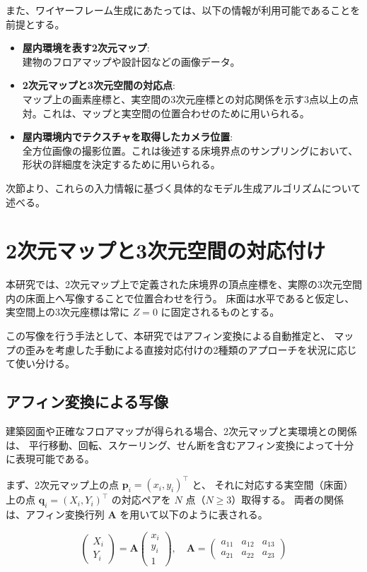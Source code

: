 また、ワイヤーフレーム生成にあたっては、以下の情報が利用可能であることを前提とする。

\begin{itemize}
  \item \textbf{屋内環境を表す2次元マップ}: \\
  建物のフロアマップや設計図などの画像データ。
  \item \textbf{2次元マップと3次元空間の対応点}: \\
  マップ上の画素座標と、実空間の3次元座標との対応関係を示す3点以上の点対。これは、マップと実空間の位置合わせのために用いられる。
  \item \textbf{屋内環境内でテクスチャを取得したカメラ位置}: \\
  全方位画像の撮影位置。これは後述する床境界点のサンプリングにおいて、形状の詳細度を決定するために用いられる。
\end{itemize}

次節より、これらの入力情報に基づく具体的なモデル生成アルゴリズムについて述べる。


\section{2次元マップと3次元空間の対応付け}

本研究では、2次元マップ上で定義された床境界の頂点座標を、実際の3次元空間内の床面上へ写像することで位置合わせを行う。
床面は水平であると仮定し、実空間上の3次元座標は常に $Z=0$ に固定されるものとする。

この写像を行う手法として、本研究ではアフィン変換による自動推定と、
マップの歪みを考慮した手動による直接対応付けの2種類のアプローチを状況に応じて使い分ける。

\subsection{アフィン変換による写像}

建築図面や正確なフロアマップが得られる場合、2次元マップと実環境との関係は、
平行移動、回転、スケーリング、せん断を含むアフィン変換によって十分に表現可能である。

まず、2次元マップ上の点 $\bm{p}_i = (x_i, y_i)^\top$ と、
それに対応する実空間（床面）上の点 $\bm{q}_i = (X_i, Y_i)^\top$ の対応ペアを $N$ 点（$N \geq 3$）取得する。
両者の関係は、アフィン変換行列 $\bm{A}$ を用いて以下のように表される。

\begin{equation}
\begin{pmatrix}
X_i \\
Y_i
\end{pmatrix}
=
\bm{A}
\begin{pmatrix}
x_i \\
y_i \\
1
\end{pmatrix}, \quad
\bm{A}
=
\begin{pmatrix}
a_{11} & a_{12} & a_{13} \\
a_{21} & a_{22} & a_{23}
\end{pmatrix}
\end{equation}

